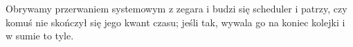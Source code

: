 Obrywamy przerwaniem systemowym z zegara i budzi się scheduler i patrzy, czy komuś nie skończył się jego kwant czasu; jeśli tak, wywala go na koniec kolejki i w sumie to tyle.